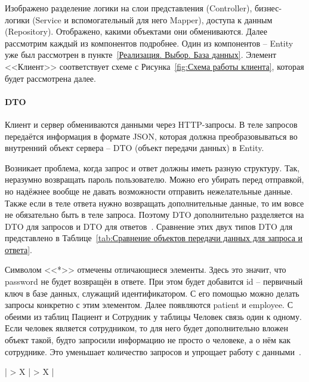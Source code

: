 \documentclass[a4paper,article]{article}
\begin{document}
\begin{sloppypar}
    Изображено разделение логики на слои представления (Controller), бизнес-логики (Service и вспомогательный для него Mapper), доступа к данным (Repository). Отображено, какими объектами они обмениваются. Далее рассмотрим каждый из компонентов подробнее. Один из компонентов -- Entity уже был рассмотрен в пункте~\ref{Реализация. Выбор. База данных}. Элемент <<Клиент>> соответствует схеме с Рисунка~\ref{fig:Схема работы клиента}, которая будет рассмотрена далее.

    \paragraph{DTO}\label{Реализация. Сервер. DTO}

    Клиент и сервер обмениваются данными через HTTP-запросы. В теле запросов передаётся информация в формате JSON, которая должна преобразовываться во внутренний объект сервера -- DTO (объект передачи данных) в Entity.

    Возникает проблема, когда запрос и ответ должны иметь разную структуру. Так, неразумно возвращать пароль пользователю. Можно его убирать перед отправкой, но надёжнее вообще не давать возможности отправить нежелательные данные. Также если в теле ответа нужно возвращать дополнительные данные, то им вовсе не обязательно быть в теле запроса. Поэтому DTO дополнительно разделяется на DTO для запросов и DTO для ответов~\cite{baeldungbook}. Сравнение этих двух типов DTO для  представлено в Таблице~\ref{tab:Сравнение объектов передачи данных для запроса и ответа}.
    
    Символом <<*>> отмечены отличающиеся элементы. Здесь это значит, что password не будет возвращён в ответе. При этом будет добавится id -- первичный ключ в базе данных, служащий идентификатором. С его помощью можно делать запросы конкретно с этим элементом. Далее появляются patient и employee. С обеими из таблиц Пациент и Сотрудник у таблицы Человек связь один к одному. Если человек является сотрудником, то для него будет дополнительно вложен объект такой, будто запросили информацию не просто о человеке, а о нём как сотруднике. Это уменьшает количество запросов и упрощает работу с данными~\cite{baeldungbook, webapi}.

    \begin{xltabular}{\textwidth} { |
        >{\hsize} X |
        >{\hsize} X | }
        \caption{\centering Сравнение объектов передачи данных сущности Person для запроса и ответа}
        \label{tab:Сравнение объектов передачи данных для запроса и ответа} \\


\end{xltabular}
\end{sloppypar}
\end{document}
